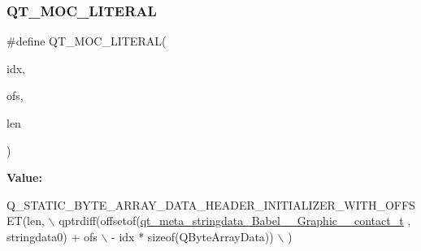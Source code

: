 \subsubsection{\texorpdfstring{Q\+T\+\_\+\+M\+O\+C\+\_\+\+L\+I\+T\+E\+R\+AL}{QT\_MOC\_LITERAL}}
{\footnotesize\ttfamily \#define Q\+T\+\_\+\+M\+O\+C\+\_\+\+L\+I\+T\+E\+R\+AL(\begin{DoxyParamCaption}\item[{}]{idx,  }\item[{}]{ofs,  }\item[{}]{len }\end{DoxyParamCaption})}

{\bfseries Value\+:}
\begin{DoxyCode}
Q\_STATIC\_BYTE\_ARRAY\_DATA\_HEADER\_INITIALIZER\_WITH\_OFFSET(len, \(\backslash\)
    qptrdiff(offsetof(\hyperlink{structqt__meta__stringdata__Babel____Graphic____contact__t}{qt\_meta\_stringdata\_Babel\_\_Graphic\_\_contact\_t}
      , stringdata0) + ofs \(\backslash\)
        - idx * \textcolor{keyword}{sizeof}(QByteArrayData)) \(\backslash\)
    )
\end{DoxyCode}
